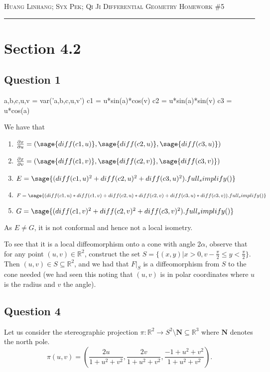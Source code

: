 \documentclass[12pt]{article}
\begin{document}
\thispagestyle{empty}

{\scshape Huang Linhang; Syx Pek; Qi Ji} \hfill {\scshape \large Differential Geometry} \hfill {\scshape Homework \#5}

\smallskip
\hrule
\bigskip
\section{Section 4.2}

\subsection*{Question 1}

\begin{sagesilent}
    a,b,c,u,v = var('a,b,c,u,v')
    c1 = u*sin(a)*cos(v)
    c2 = u*sin(a)*sin(v)
    c3 = u*cos(a)
\end{sagesilent}

We have that
\begin{enumerate}
\item $\frac{ \partial x}{\partial u} = (\sage{diff(c1,u)}, \sage{diff(c2, u)}, \sage{diff(c3,u)})$ 
\item $\frac{ \partial x}{\partial v} = (\sage{diff(c1,v)}, \sage{diff(c2, v)}, \sage{diff(c3,v)})$
\item $E = \sage{(diff(c1,u)^2 + diff(c2,u)^2 + diff(c3,u)^2).full_simplify()}$
\item $F = \sage{(diff(c1,u)*diff(c1,v) + diff(c2,u)*diff(c2,v) + diff(c3,u)*diff(c3,v)).full_simplify()}$ 
\item $G = \sage{(diff(c1,v)^2 + diff(c2,v)^2 + diff(c3,v)^2).full_simplify()}$
\end{enumerate}

As $E \neq G$, it is not conformal and hence not a local isometry.

To see that it is a local diffeomorphism onto a cone with angle $2\alpha$, observe that for any point $(u, v) \in \mathbb R^2$, construct the set $S = \{(x, y)| x > 0, v-\frac\pi2 \leq y < \frac\pi2\}$. Then $(u, v) \in S \subseteq \mathbb R^2$, and we had that $F|_S$ is a diffeomorphism from $S$ to the cone needed (we had seen this noting that $(u,v)$ is in polar coordinates where $u$ is the radius and $v$ the angle).


\subsection*{Question 4}

Let us consider the stereographic projection $\pi: \mathbb R^2 \to S^2 \setminus{\textbf{N}} \subseteq \mathbb R^3$ where $\textbf{N}$ denotes the north pole.
$$\pi(u, v) = \left(\frac{2u}{1 + u^2 + v^2}, \frac{2v}{1 + u^2 + v^2}, \frac{-1 + u^2 + v^2}{1 + u^2 + v^2} \right).$$
\end{document}
